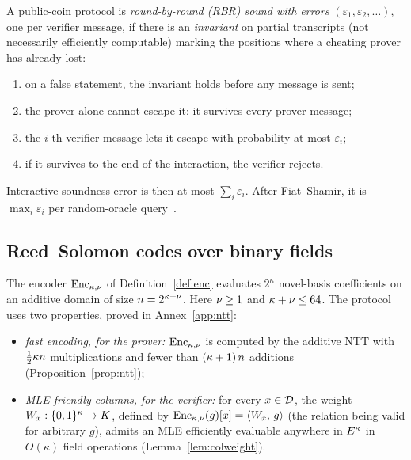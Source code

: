 \begin{definition}\label{def:rbr}
A public-coin protocol is \emph{round-by-round (RBR) sound with errors} $(\varepsilon_1, \varepsilon_2, \dots)$, one per verifier message, if there is an \emph{invariant} on partial transcripts (not necessarily efficiently computable) marking the positions where a cheating prover has already lost:
\begin{enumerate}[itemsep=1pt,label=(\roman*)]
\item on a false statement, the invariant holds before any message is sent;
\item the prover alone cannot escape it: it survives every prover message;
\item the $i$-th verifier message lets it escape with probability at most $\varepsilon_i$;
\item if it survives to the end of the interaction, the verifier rejects.
\end{enumerate}
\end{definition}

Interactive soundness error is then at most $\sum_i \varepsilon_i$. After Fiat--Shamir, it is $\max_i \varepsilon_i$ per random-oracle query~\cite{CCHLRR19,BCS16}.

\subsection{Reed--Solomon codes over binary fields}\label{sec:binary-rs}

The encoder $\mathrm{Enc}_{\kappa,\nu}$ of Definition~\ref{def:enc} evaluates $2^\kappa$ novel-basis coefficients on an additive domain of size $n=2^{\kappa+\nu}$. Here $\nu\ge1$ and $\kappa+\nu\le64$. The protocol uses two properties, proved in Annex~\ref{app:ntt}:
\begin{itemize}[itemsep=2pt]
\item \emph{fast encoding, for the prover:} $\mathrm{Enc}_{\kappa,\nu}$ is computed by the additive NTT with $\tfrac12 \kappa n$ multiplications and fewer than $(\kappa + 1)\, n$ additions (Proposition~\ref{prop:ntt});
\item \emph{MLE-friendly columns, for the verifier:} for every $x \in \mathcal{D}$, the weight $W_x : \{0,1\}^{\kappa} \to K$, defined by $\mathrm{Enc}_{\kappa,\nu}(g)[x] = \langle W_x,\, g \rangle$ (the relation being valid for arbitrary $g$), admits an MLE efficiently evaluable anywhere in $E^{\kappa}$ in $O(\kappa)$ field operations (Lemma~\ref{lem:colweight}).
\end{itemize}

